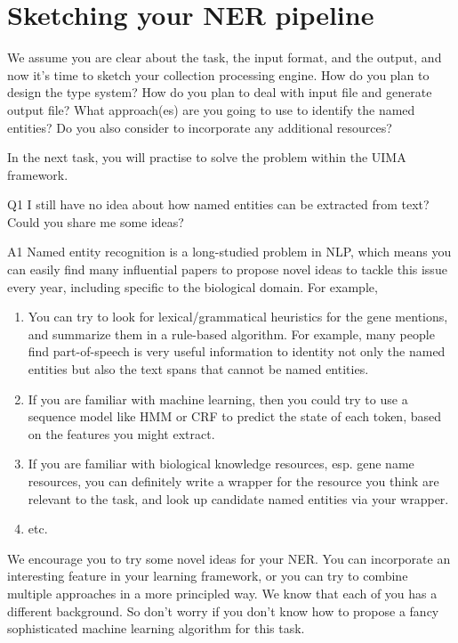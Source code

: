 
\section{Sketching your NER pipeline}

We assume you are clear about the task, the input format, and the output, and
now it's time to sketch your collection processing engine. How do you plan to
design the type system? How do you plan to deal with input file and generate
output file? What approach(es) are you going to use to identify the named
entities? Do you also consider to incorporate any additional resources?

In the next task, you will practise to solve the problem within the UIMA
framework.

\begin{qa}

\item[Q1] I still have no idea about how named entities can be extracted from
text? Could you share me some ideas?

\item[A1] Named entity recognition is a long-studied problem in NLP, which means
you can easily find many influential papers to propose novel ideas to tackle
this issue every year, including specific to the biological domain. For example,

\begin{enumerate}
\item You can try to look for lexical/grammatical heuristics for the gene
mentions, and summarize them in a rule-based algorithm. For example, many people
find part-of-speech is very useful information to identity not only the named
entities but also the text spans that cannot be named entities.
\item If you are familiar with machine learning, then you could try to use a
sequence model like HMM or CRF to predict the state of each token, based on the
features you might extract.
\item If you are familiar with biological knowledge resources, esp. gene name
resources, you can definitely write a wrapper for the resource you think are
relevant to the task, and look up candidate named entities via your wrapper.
\item etc.
\end{enumerate}

We encourage you to try some novel ideas for your NER. You can incorporate an
interesting feature in your learning framework, or you can try to combine
multiple approaches in a more principled way. We know that each of you has a
different background. So don't worry if you don't know how to propose a fancy
sophisticated machine learning algorithm for this task.


\end{qa}
